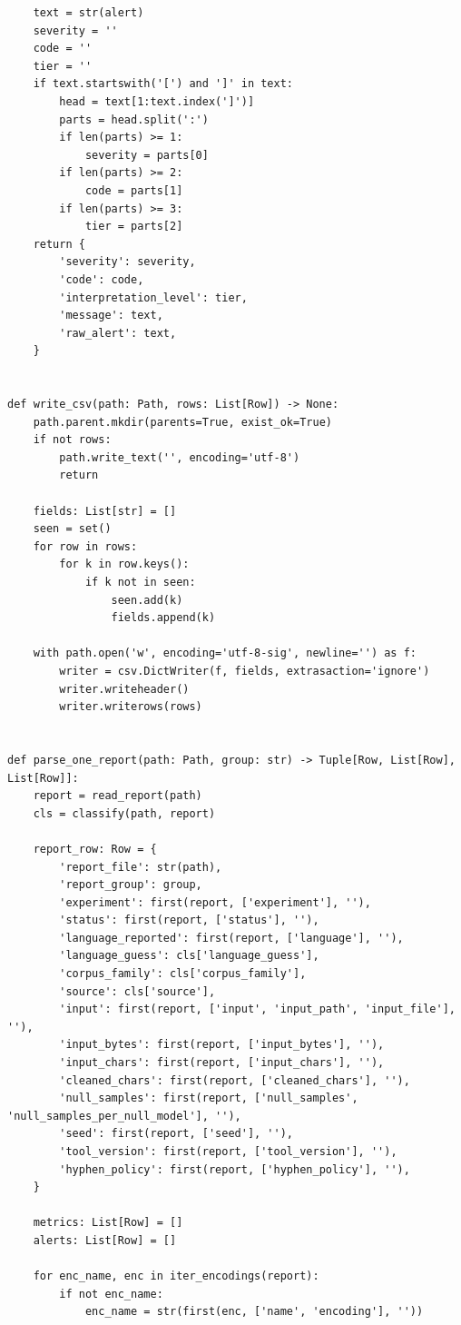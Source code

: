 \documentclass[11pt,a4paper]{article}
\begin{document}
\begin{lstlisting}
    text = str(alert)
    severity = ''
    code = ''
    tier = ''
    if text.startswith('[') and ']' in text:
        head = text[1:text.index(']')]
        parts = head.split(':')
        if len(parts) >= 1:
            severity = parts[0]
        if len(parts) >= 2:
            code = parts[1]
        if len(parts) >= 3:
            tier = parts[2]
    return {
        'severity': severity,
        'code': code,
        'interpretation_level': tier,
        'message': text,
        'raw_alert': text,
    }


def write_csv(path: Path, rows: List[Row]) -> None:
    path.parent.mkdir(parents=True, exist_ok=True)
    if not rows:
        path.write_text('', encoding='utf-8')
        return

    fields: List[str] = []
    seen = set()
    for row in rows:
        for k in row.keys():
            if k not in seen:
                seen.add(k)
                fields.append(k)

    with path.open('w', encoding='utf-8-sig', newline='') as f:
        writer = csv.DictWriter(f, fields, extrasaction='ignore')
        writer.writeheader()
        writer.writerows(rows)


def parse_one_report(path: Path, group: str) -> Tuple[Row, List[Row], List[Row]]:
    report = read_report(path)
    cls = classify(path, report)

    report_row: Row = {
        'report_file': str(path),
        'report_group': group,
        'experiment': first(report, ['experiment'], ''),
        'status': first(report, ['status'], ''),
        'language_reported': first(report, ['language'], ''),
        'language_guess': cls['language_guess'],
        'corpus_family': cls['corpus_family'],
        'source': cls['source'],
        'input': first(report, ['input', 'input_path', 'input_file'], ''),
        'input_bytes': first(report, ['input_bytes'], ''),
        'input_chars': first(report, ['input_chars'], ''),
        'cleaned_chars': first(report, ['cleaned_chars'], ''),
        'null_samples': first(report, ['null_samples', 'null_samples_per_null_model'], ''),
        'seed': first(report, ['seed'], ''),
        'tool_version': first(report, ['tool_version'], ''),
        'hyphen_policy': first(report, ['hyphen_policy'], ''),
    }

    metrics: List[Row] = []
    alerts: List[Row] = []

    for enc_name, enc in iter_encodings(report):
        if not enc_name:
            enc_name = str(first(enc, ['name', 'encoding'], ''))


\end{lstlisting}
\end{document}
